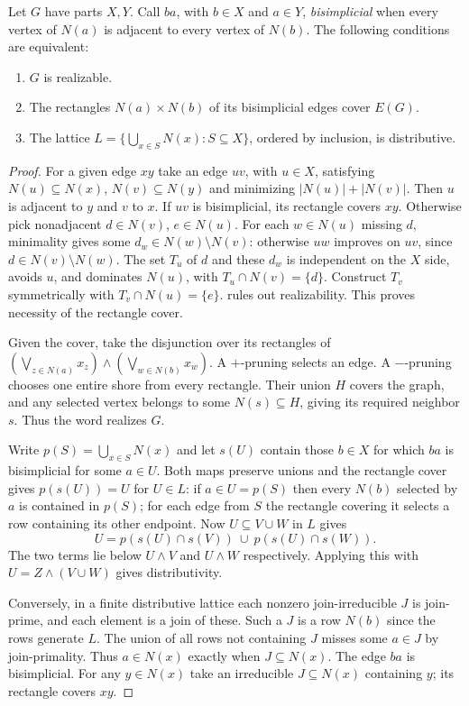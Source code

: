 \begin{theorem}\label{core:thm:bipartite-prunings}
Let $G$ have parts $X,Y$. Call $ba$, with $b\in X$ and $a\in Y$,
\emph{bisimplicial} when every vertex of $N(a)$ is adjacent to every
vertex of $N(b)$. The following conditions are equivalent:
\begin{enumerate}
\item $G$ is realizable.
\item The rectangles $N(a)\times N(b)$ of its bisimplicial edges cover $E(G)$.
\item The lattice $L=\{\bigcup_{x\in S}N(x):S\subseteq X\}$, ordered
by inclusion, is distributive.
\end{enumerate}
\end{theorem}
\begin{proof}
For a given edge $xy$ take an edge $uv$, with $u\in X$, satisfying
$N(u)\subseteq N(x)$, $N(v)\subseteq N(y)$ and minimizing
$|N(u)|+|N(v)|$. Then $u$ is adjacent to $y$ and $v$ to $x$.
If $uv$ is bisimplicial, its rectangle covers $xy$. Otherwise pick
nonadjacent $d\in N(v)$, $e\in N(u)$. For each $w\in N(u)$
missing $d$, minimality gives some $d_w\in N(w)\setminus N(v)$:
otherwise $uw$ improves on $uv$, since $d\in N(v)\setminus N(w)$.
The set $T_u$ of $d$ and these $d_w$ is independent on the $X$ side,
avoids $u$, and dominates $N(u)$, with $T_u\cap N(v)=\{d\}$.
Construct $T_v$ symmetrically with $T_v\cap N(u)=\{e\}$.
 rules out realizability. This proves
necessity of the rectangle cover.

Given the cover, take the disjunction over its rectangles of
$(\bigvee_{z\in N(a)}x_z)\land(\bigvee_{w\in N(b)}x_w)$.
A $+$-pruning selects an edge. A $-$-pruning chooses one entire
shore from every rectangle. Their union $H$ covers the graph, and
any selected vertex belongs to some $N(s)\subseteq H$, giving its
required neighbor $s$. Thus the word realizes $G$.

Write $p(S)=\bigcup_{x\in S}N(x)$ and let $s(U)$ contain those
$b\in X$ for which $ba$ is bisimplicial for some $a\in U$.
Both maps preserve unions and the rectangle cover gives $p(s(U))=U$
for $U\in L$: if $a\in U=p(S)$ then every $N(b)$ selected by $a$
is contained in $p(S)$; for each edge from $S$ the rectangle covering
it selects a row containing its other endpoint. Now $U\subseteq V\cup W$
in $L$ gives
\[
 U=p(s(U)\cap s(V))\ \cup\ p(s(U)\cap s(W)).
\]
The two terms lie below $U\wedge V$ and $U\wedge W$ respectively.
Applying this with $U=Z\wedge(V\cup W)$ gives distributivity.

Conversely, in a finite distributive lattice each nonzero join-irreducible
$J$ is join-prime, and each element is a join of these. Such a $J$ is
a row $N(b)$ since the rows generate $L$. The union of all rows not
containing $J$ misses some $a\in J$ by join-primality. Thus $a\in N(x)$
exactly when $J\subseteq N(x)$. The edge $ba$ is bisimplicial. For
any $y\in N(x)$ take an irreducible $J\subseteq N(x)$ containing $y$;
its rectangle covers $xy$.
\end{proof}

